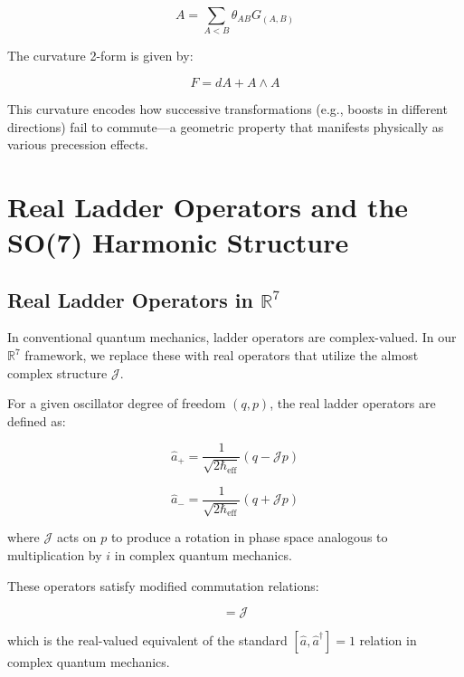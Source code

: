 \documentclass{article}
\begin{document}
\begin{equation}
A = \sum_{A<B} \theta_{AB} G_{(A,B)}
\end{equation}

The curvature 2-form is given by:

\begin{equation}
F = dA + A \wedge A
\end{equation}

This curvature encodes how successive transformations (e.g., boosts in different directions) fail to commute—a geometric property that manifests physically as various precession effects.

\section{Real Ladder Operators and the SO(7) Harmonic Structure}

\subsection{Real Ladder Operators in $\mathbb{R}^7$}

In conventional quantum mechanics, ladder operators are complex-valued. In our $\mathbb{R}^7$ framework, we replace these with real operators that utilize the almost complex structure $\mathcal{J}$.

For a given oscillator degree of freedom $(q, p)$, the real ladder operators are defined as:

\begin{equation}
\hat{a}_+ = \frac{1}{\sqrt{2\hbar_{\text{eff}}}}(q - \mathcal{J}p)
\end{equation}

\begin{equation}
\hat{a}_- = \frac{1}{\sqrt{2\hbar_{\text{eff}}}}(q + \mathcal{J}p)
\end{equation}

where $\mathcal{J}$ acts on $p$ to produce a rotation in phase space analogous to multiplication by $i$ in complex quantum mechanics.

These operators satisfy modified commutation relations:

\begin{equation}
[\hat{a}_+, \hat{a}_-] = \mathcal{J}
\end{equation}

which is the real-valued equivalent of the standard $[\hat{a}, \hat{a}^\dagger] = 1$ relation in complex quantum mechanics.
\end{document}
